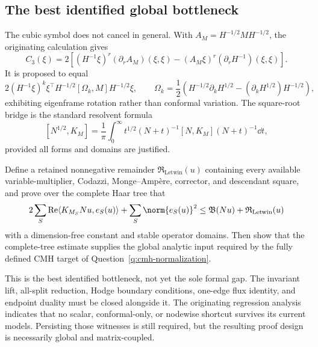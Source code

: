 \documentclass[../../main.tex]{subfiles}
\begin{document}
\subsection{The best identified global bottleneck}

The cubic symbol does not cancel in general. With $A_M=H^{-1/2}MH^{-1/2}$, the originating
calculation gives
\[
  C_3(\xi)=2\left[(H^{-1}\xi)^r(\partial_rA_M)(\xi,\xi)
  -(A_M\xi)^r(\partial_rH^{-1})(\xi,\xi)\right].
\]
It is proposed to equal
\[
  2(H^{-1}\xi)^k\xi^\top H^{-1/2}[\Omega_k,M]H^{-1/2}\xi,
  \qquad
  \Omega_k=\frac12\left(H^{-1/2}\partial_kH^{1/2}
  -(\partial_kH^{1/2})H^{-1/2}\right),
\]
exhibiting eigenframe rotation rather than conformal variation. The square-root bridge is the
standard resolvent formula
\[
  [N^{1/2},K_M]
  =\frac1\pi\int_0^\infty t^{1/2}(N+t)^{-1}
  [N,K_M](N+t)^{-1}\dd t,
\]
provided all forms and domains are justified.

\begin{question}
\label{q:mm-square-root-commutator}
Define a retained nonnegative remainder $\mathfrak R_{\mathrm{Letwin}}(u)$ containing every
available variable-multiplier, Codazzi, Monge--Amp\`ere, corrector, and descendant square, and
prove over the complete Haar tree that
\[
  2\sum_S\operatorname{Re}\langle K_{M_S}Nu,e_S(u)\rangle
  +\sum_S\norm{e_S(u)}^2
  \le \mathfrak B(Nu)+\mathfrak R_{\mathrm{Letwin}}(u)
\]
with a dimension-free constant and stable operator domains. Then show that the complete-tree
estimate supplies the global analytic input required by the fully defined CMH target of
Question~\ref{q:cmh-normalization}.
\end{question}

This is the best identified bottleneck, not yet the sole formal gap. The invariant lift, all-split
reduction, Hodge boundary conditions, one-edge flux identity, and endpoint duality must be closed
alongside it. The originating regression analysis indicates that no scalar, conformal-only, or
nodewise shortcut survives its current models. Persisting those witnesses is still required, but
the resulting proof design is necessarily global and matrix-coupled.
\end{document}
